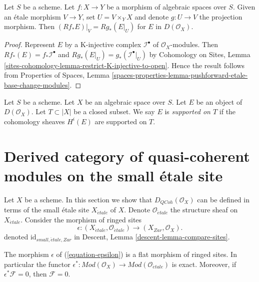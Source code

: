 \begin{lemma}
\label{lemma-restrict-direct-image-open}
Let $S$ be a scheme. Let $f : X \to Y$ be a morphism of algebraic spaces
over $S$. Given an \'etale morphism $V \to Y$, set $U = V \times_Y X$
and denote $g : U \to V$ the projection morphism. Then
$(Rf_*E)|_V = Rg_*(E|_U)$ for $E$ in $D(\mathcal{O}_X)$.
\end{lemma}

\begin{proof}
Represent $E$ by a K-injective complex $\mathcal{I}^\bullet$ of
$\mathcal{O}_X$-modules. Then $Rf_*(E) = f_*\mathcal{I}^\bullet$
and $Rg_*(E|_U) = g_*(\mathcal{I}^\bullet|_U)$ by
Cohomology on Sites, Lemma
\ref{sites-cohomology-lemma-restrict-K-injective-to-open}.
Hence the result follows from
Properties of Spaces,
Lemma \ref{spaces-properties-lemma-pushforward-etale-base-change-modules}.
\end{proof}

\begin{definition}
\label{definition-supported-on}
Let $S$ be a scheme. Let $X$ be an algebraic space over $S$.
Let $E$ be an object of $D(\mathcal{O}_X)$.
Let $T \subset |X|$ be a closed subset.
We say $E$ is {\it supported on $T$} if the
cohomology sheaves $H^i(E)$ are supported on $T$.
\end{definition}








\section{Derived category of quasi-coherent modules on the small \'etale site}
\label{section-derived-quasi-coherent-etale}

\noindent
Let $X$ be a scheme. In this section we show that $D_{QCoh}(\mathcal{O}_X)$
can be defined in terms of the small \'etale site $X_{\acute{e}tale}$ of $X$.
Denote $\mathcal{O}_{\acute{e}tale}$ the structure sheaf on
$X_{\acute{e}tale}$. 
Consider the morphism of ringed sites
\begin{equation}
\label{equation-epsilon}
\epsilon :
(X_{\acute{e}tale}, \mathcal{O}_{\acute{e}tale})
\longrightarrow
(X_{Zar}, \mathcal{O}_X).
\end{equation}
denoted $\text{id}_{small, \acute{e}tale, Zar}$ in
Descent, Lemma \ref{descent-lemma-compare-sites}.

\begin{lemma}
\label{lemma-epsilon-flat}
The morphism $\epsilon$ of (\ref{equation-epsilon})
is a flat morphism of ringed sites. In particular the functor
$\epsilon^* : \textit{Mod}(\mathcal{O}_X) \to
\textit{Mod}(\mathcal{O}_{\acute{e}tale})$ is exact.
Moreover, if $\epsilon^*\mathcal{F} = 0$, then $\mathcal{F} = 0$.
\end{lemma}

